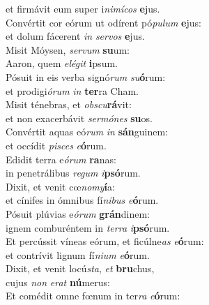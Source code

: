\oddverse et firmávit eum super i\textit{ni}\textit{mí}\textit{cos} \textbf{e}jus.\\
\evenverse Convértit cor eórum ut odírent pó\textit{pu}\textit{lum} \textbf{e}jus:~\*\\
\evenverse et dolum fácerent \textit{in} \textit{ser}\textit{vos} \textbf{e}jus.\\
\oddverse Misit Móysen, \textit{ser}\textit{vum} \textbf{su}um:~\*\\
\oddverse Aaron, quem \textit{e}\textit{lé}\textit{git} \textbf{i}psum.\\
\evenverse Pósuit in eis verba signó\textit{rum} \textit{su}\textbf{ó}rum:~\*\\
\evenverse et prodigi\textit{ó}\textit{rum} \textit{in} \textbf{ter}ra Cham.\\
\oddverse Misit ténebras, et \textit{ob}\textit{scu}\textbf{rá}vit:~\*\\
\oddverse et non exacerbávit \textit{ser}\textit{mó}\textit{nes} \textbf{su}os.\\
\evenverse Convértit aquas eó\textit{rum} \textit{in} \textbf{sán}guinem:~\*\\
\evenverse et occídit \textit{pi}\textit{sces} \textit{e}\textbf{ó}rum.\\
\oddverse Edidit terra e\textit{ó}\textit{rum} \textbf{ra}nas:~\*\\
\oddverse in penetrálibus \textit{re}\textit{gum} \textit{i}\textbf{psó}rum.\\
\evenverse Dixit, et venit cœ\textit{no}\textit{my}\textbf{í}a:~\*\\
\evenverse et cínifes in ómnibus fí\textit{ni}\textit{bus} \textit{e}\textbf{ó}rum.\\
\oddverse Pósuit plúvias e\textit{ó}\textit{rum} \textbf{grán}dinem:~\*\\
\oddverse ignem comburéntem in \textit{ter}\textit{ra} \textit{i}\textbf{psó}rum.\\
\evenverse Et percússit víneas eórum, et ficúlne\textit{as} \textit{e}\textbf{ó}rum:~\*\\
\evenverse et contrívit lignum fí\textit{ni}\textit{um} \textit{e}\textbf{ó}rum.\\
\oddverse Dixit, et venit locú\textit{sta}, \textit{et} \textbf{bru}chus,~\*\\
\oddverse cujus \textit{non} \textit{e}\textit{rat} \textbf{nú}merus:\\
\evenverse Et comédit omne fœnum in ter\textit{ra} \textit{e}\textbf{ó}rum:~\*\\
